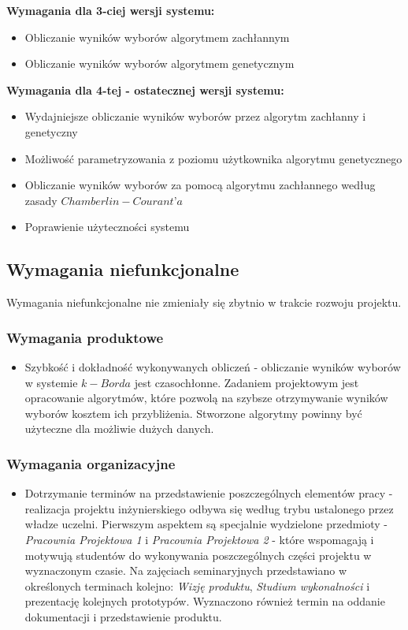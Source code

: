 \documentclass[pdflatex,11pt]{../aghdoc_version2}
\begin{document}
\textbf{Wymagania dla 3-ciej wersji systemu:}
\begin{itemize}
\item Obliczanie wyników wyborów algorytmem zachłannym
\item Obliczanie wyników wyborów algorytmem genetycznym
\end{itemize}
\vspace{\baselineskip}
\textbf{Wymagania dla 4-tej - ostatecznej wersji systemu:}
\begin{itemize}
\item Wydajniejsze obliczanie wyników wyborów przez algorytm zachłanny i genetyczny
\item Możliwość parametryzowania z poziomu użytkownika algorytmu genetycznego
\item Obliczanie wyników wyborów za pomocą algorytmu zachłannego
według zasady $Chamberlin-Courant’a$
\item Poprawienie użyteczności systemu
\end{itemize}

\subsection{Wymagania niefunkcjonalne}
Wymagania niefunkcjonalne nie zmieniały się zbytnio w trakcie rozwoju projektu.

\subsubsection{Wymagania produktowe}
\begin{itemize}
\item Szybkość i dokładność wykonywanych obliczeń - obliczanie wyników wyborów w
systemie $k-Borda$ jest czasochłonne. Zadaniem projektowym jest opracowanie
algorytmów, które pozwolą na szybsze otrzymywanie wyników wyborów kosztem ich
przybliżenia. Stworzone algorytmy powinny być użyteczne dla możliwie dużych
danych.
\end{itemize}

\subsubsection{Wymagania organizacyjne}
\begin{itemize}
\item Dotrzymanie terminów na przedstawienie poszczególnych elementów pracy -
realizacja projektu inżynierskiego odbywa się według trybu ustalonego przez władze
uczelni. Pierwszym aspektem są specjalnie wydzielone przedmioty - \textit{Pracownia
Projektowa 1} i \textit{Pracownia Projektowa 2} - które wspomagają i motywują studentów
do wykonywania poszczególnych części projektu w wyznaczonym czasie. Na
zajęciach seminaryjnych przedstawiano w określonych terminach kolejno: \textit{Wizję
produktu}, \textit{Studium wykonalności} i prezentację kolejnych prototypów. Wyznaczono
również termin na oddanie dokumentacji i przedstawienie produktu.
\end{itemize}
\end{document}
